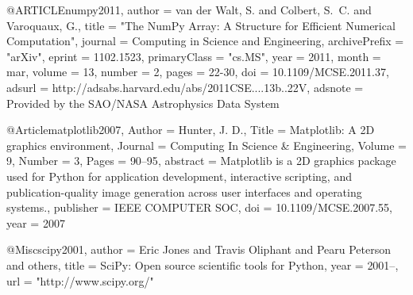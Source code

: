@ARTICLE{numpy2011,
   author = {{van der Walt}, S. and {Colbert}, S.~C. and {Varoquaux}, G.},
    title = "{The NumPy Array: A Structure for Efficient Numerical Computation}",
  journal = {Computing in Science and Engineering},
archivePrefix = "arXiv",
   eprint = {1102.1523},
 primaryClass = "cs.MS",
     year = 2011,
    month = mar,
   volume = 13,
   number = 2,
    pages = {22-30},
      doi = {10.1109/MCSE.2011.37},
   adsurl = {http://adsabs.harvard.edu/abs/2011CSE....13b..22V},
  adsnote = {Provided by the SAO/NASA Astrophysics Data System}
}




@Article{matplotlib2007,
  Author    = {Hunter, J. D.},
  Title     = {Matplotlib: A 2D graphics environment},
  Journal   = {Computing In Science \& Engineering},
  Volume    = {9},
  Number    = {3},
  Pages     = {90--95},
  abstract  = {Matplotlib is a 2D graphics package used for Python
  for application development, interactive scripting, and
  publication-quality image generation across user
  interfaces and operating systems.},
  publisher = {IEEE COMPUTER SOC},
  doi       = {10.1109/MCSE.2007.55},
  year      = 2007
}




@Misc{scipy2001,
  author =    {Eric Jones and Travis Oliphant and Pearu Peterson and others},
  title =     {{SciPy}: Open source scientific tools for {Python}},
  year =      {2001--},
  url = "http://www.scipy.org/"
}

